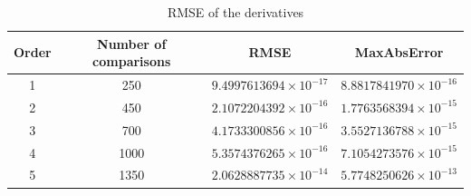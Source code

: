 ﻿\begin{table}[ht]
\centering
\caption{RMSE of the derivatives}
\label{tab:alephion_rmse_orders}
\begin{tabular}{cccc}
\hline
Order & Number of comparisons & RMSE & MaxAbsError \\
\hline
1 & 250 & $9.4997613694 \times 10^{-17}$ & $8.8817841970 \times 10^{-16}$ \\
2 & 450 & $2.1072204392 \times 10^{-16}$ & $1.7763568394 \times 10^{-15}$ \\
3 & 700 & $4.1733300856 \times 10^{-16}$ & $3.5527136788 \times 10^{-15}$ \\
4 & 1000 & $5.3574376265 \times 10^{-16}$ & $7.1054273576 \times 10^{-15}$ \\
5 & 1350 & $2.0628887735 \times 10^{-14}$ & $5.7748250626 \times 10^{-13}$ \\
\hline
\end{tabular}
\end{table}
